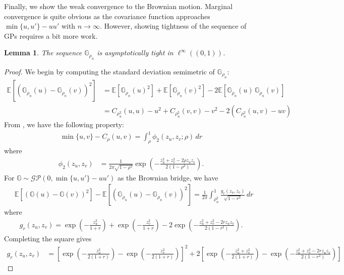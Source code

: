 \documentclass[11pt,a4paper]{article}
\newtheorem{lem}{Lemma}
\newcommand{\E}{\mathbb{E}}
\begin{document}
\begin{appendices}
Finally, we show the weak convergence to the Brownian motion. Marginal convergence is quite obvious as the covariance function approaches $\min\{u,u'\} - uu'$ with $n\to \infty$. However, showing tightness of the sequence of GPs requires a bit more work.
\begin{lem}
    The sequence $\mathbb{G}_{\rho_n}$ is asymptotically tight in $\ell^\infty((0,1))$.
\end{lem}
\begin{proof}
We begin by computing the standard deviation semimetric of $\mathbb{G}_{\rho_n}$:
\begin{align*}
    \E\left[\left(\mathbb{G}_{\rho_n}(u) - \mathbb{G}_{\rho_n}(v) \right)^2\right] &=     \E\left[\mathbb{G}_{\rho_n}(u)^2\right] + \E\left[\mathbb{G}_{\rho_n}(v)^2\right] - 2\E\left[\mathbb{G}_{\rho_n}(u)\, \mathbb{G}_{\rho_n}(v)\right]\\
    &=C_{\rho_n^2}(u,u) - u^2 +  C_{\rho_n^2}(v,v) - {v}^2 - 2\left(C_{\rho_n^2}(u,v) - uv \right)
\end{align*}
From \cite{Meyer2013}, we have the following  property:
\begin{align*}
    \min\{u,v\} - C_{\rho}(u,v) = \int_{\rho}^1 \phi_{2}\left(z_u, z_v; \rho\right)\, dr
\end{align*}
where
\begin{align*}
    \phi_2(z_u,z_v) &= \frac{1}{2\pi\sqrt{1-\rho^2}}\exp\left(-\frac{z_u^2 + z_v^2 - 2\rho z_u z_v}{2(1-\rho^2)}\right).
\end{align*}
For $\mathbb{G} \sim \mathcal{GP}(0,\min\{u,u'\} - uu')$ as the Brownian bridge, we have
\begin{align*}
  &\E\left[\left(\mathbb{G}(u) -\mathbb{G}(v) \right)^2\right] - \E\left[\left(\mathbb{G}_{\rho_n}(u) - \mathbb{G}_{\rho_n}(v) \right)^2\right] =\frac{1}{2\pi} \int_{\rho_n^2}^1 \frac{g_r(z_u,z_v) }{\sqrt{1- r^2}}\, dr
\end{align*}
where
\begin{align*}
   g_r(z_u,z_v) =  \exp\left(- \frac{z_u^2}{1+r}\right) +\exp\left(- \frac{z_v^2}{1+r}\right)- 2\exp\left(-\frac{z_u^2 + z_v^2 - 2r z_u z_v}{2(1-r^2)}\right).
\end{align*}
Completing the square gives
\begin{align*}
   g_r(z_u,z_v) &= \left[\exp\left(- \frac{z_u^2}{2(1+r)}\right) -\exp\left(- \frac{z_v^2}{2(1+r)}\right)\right]^2 +2\left[\exp\left(-\frac{z_u^2 + z_v^2}{2(1+r)}\right)-\exp\left(-\frac{z_u^2 + z_v^2 - 2r z_u z_v}{2(1-r^2)}\right) \right]
\end{align*}

\end{proof}
\end{appendices}
\end{document}
